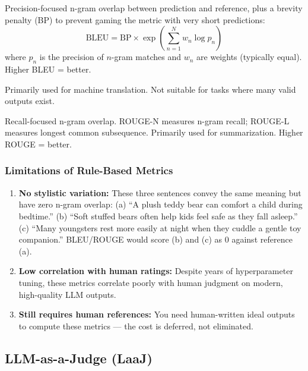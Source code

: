 \documentclass[11pt, a4paper]{article}
\begin{document}
\begin{defbox}
Precision-focused n-gram overlap between prediction and reference, plus a brevity penalty (BP) to prevent gaming the metric with very short predictions:
\[
\text{BLEU} = \text{BP} \times \exp\!\left(\sum_{n=1}^{N} w_n \log p_n\right)
\]
where $p_n$ is the precision of $n$-gram matches and $w_n$ are weights (typically equal). Higher BLEU = better.

Primarily used for machine translation. Not suitable for tasks where many valid outputs exist.
\end{defbox}

\begin{defbox}
Recall-focused n-gram overlap. ROUGE-N measures n-gram recall; ROUGE-L measures longest common subsequence. Primarily used for summarization. Higher ROUGE = better.
\end{defbox}

\subsubsection{Limitations of Rule-Based Metrics}

\begin{warnbox}
\begin{enumerate}[leftmargin=1.5em]
  \item \textbf{No stylistic variation:} These three sentences convey the same meaning but have zero n-gram overlap: (a) ``A plush teddy bear can comfort a child during bedtime.'' (b) ``Soft stuffed bears often help kids feel safe as they fall asleep.'' (c) ``Many youngsters rest more easily at night when they cuddle a gentle toy companion.'' BLEU/ROUGE would score (b) and (c) as 0 against reference (a).
  \item \textbf{Low correlation with human ratings:} Despite years of hyperparameter tuning, these metrics correlate poorly with human judgment on modern, high-quality LLM outputs.
  \item \textbf{Still requires human references:} You need human-written ideal outputs to compute these metrics --- the cost is deferred, not eliminated.
\end{enumerate}
\end{warnbox}

\subsection{LLM-as-a-Judge (LaaJ)}
\end{document}
